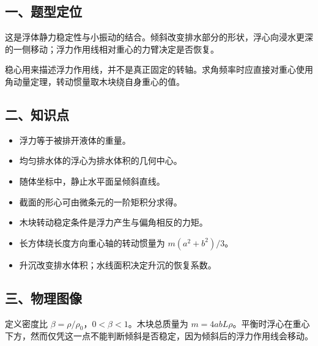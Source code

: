 \documentclass[12pt,a4paper,fontset=fandol]{ctexart}
\providecommand{\tightlist}{\setlength{\itemsep}{0pt}\setlength{\parskip}{0pt}}
\begin{document}
\subsection{一、题型定位}\label{ux4e00ux9898ux578bux5b9aux4f4d-4}

这是浮体静力稳定性与小振动的结合。倾斜改变排水部分的形状，浮心向浸水更深的一侧移动；浮力作用线相对重心的力臂决定是否恢复。

稳心用来描述浮力作用线，并不是真正固定的转轴。求角频率时应直接对重心使用角动量定理，转动惯量取木块绕自身重心的值。

\subsection{二、知识点}\label{ux4e8cux77e5ux8bc6ux70b9-4}

\begin{itemize}
\tightlist
\item
  浮力等于被排开液体的重量。
\item
  均匀排水体的浮心为排水体积的几何中心。
\item
  随体坐标中，静止水平面呈倾斜直线。
\item
  截面的形心可由微条元的一阶矩积分求得。
\item
  木块转动稳定条件是浮力产生与偏角相反的力矩。
\item
  长方体绕长度方向重心轴的转动惯量为 \(m(a^2+b^2)/3\)。
\item
  升沉改变排水体积；水线面积决定升沉的恢复系数。
\end{itemize}

\subsection{三、物理图像}\label{ux4e09ux7269ux7406ux56feux50cf-4}

定义密度比 \(\beta=\rho/\rho_0\)，\(0<\beta<1\)。木块总质量为
\(m=4abL\rho\)。平衡时浮心在重心下方，然而仅凭这一点不能判断倾斜是否稳定，因为倾斜后的浮力作用线会移动。
\end{document}
